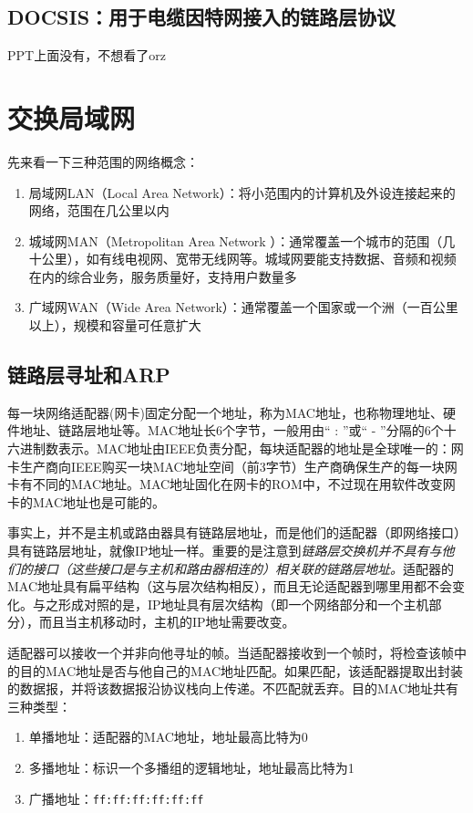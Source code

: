 \documentclass[]{report}
\begin{document}
		\subsection{DOCSIS：用于电缆因特网接入的链路层协议}
		PPT上面没有，不想看了orz
	\section{交换局域网}
	先来看一下三种范围的网络概念：
	\begin{enumerate}
		\item 局域网LAN（Local Area Network）：将小范围内的计算机及外设连接起来的网络，范围在几公里以内
		\item 城域网MAN（Metropolitan Area Network ）：通常覆盖一个城市的范围（几十公里），如有线电视网、宽带无线网等。城域网要能支持数据、音频和视频在内的综合业务，服务质量好，支持用户数量多
		\item 广域网WAN（Wide Area Network）：通常覆盖一个国家或一个洲（一百公里以上），规模和容量可任意扩大
	\end{enumerate}
		\subsection{链路层寻址和ARP}
		每一块网络适配器(网卡)固定分配一个地址，称为MAC地址，也称物理地址、硬件地址、链路层地址等。MAC地址长6个字节，一般用由“ : ”或“ - ”分隔的6个十六进制数表示。MAC地址由IEEE负责分配，每块适配器的地址是全球唯一的：网卡生产商向IEEE购买一块MAC地址空间（前3字节）生产商确保生产的每一块网卡有不同的MAC地址。MAC地址固化在网卡的ROM中，不过现在用软件改变网卡的MAC地址也是可能的。\par
		事实上，并不是主机或路由器具有链路层地址，而是他们的适配器（即网络接口）具有链路层地址，就像IP地址一样。重要的是注意到\textit{链路层交换机并不具有与他们的接口（这些接口是与主机和路由器相连的）相关联的链路层地址。}适配器的MAC地址具有扁平结构（这与层次结构相反），而且无论适配器到哪里用都不会变化。与之形成对照的是，IP地址具有层次结构（即一个网络部分和一个主机部分），而且当主机移动时，主机的IP地址需要改变。\par
		适配器可以接收一个并非向他寻址的帧。当适配器接收到一个帧时，将检查该帧中的目的MAC地址是否与他自己的MAC地址匹配。如果匹配，该适配器提取出封装的数据报，并将该数据报沿协议栈向上传递。不匹配就丢弃。目的MAC地址共有三种类型：
		\begin{enumerate}
			\item 单播地址：适配器的MAC地址，地址最高比特为0
			\item 多播地址：标识一个多播组的逻辑地址，地址最高比特为1
			\item 广播地址：\texttt{ff:ff:ff:ff:ff:ff}
		\end{enumerate}
\end{document}
